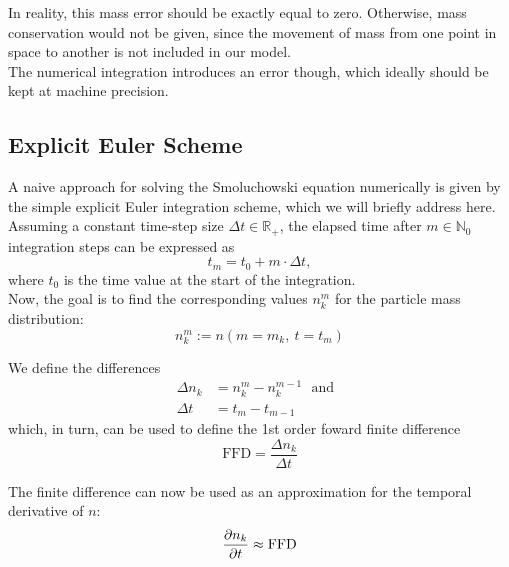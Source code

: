         In reality, this mass error should be exactly equal to zero. Otherwise, mass conservation would not be given, since the movement of mass from one point in space to another is not included in our model. \\
        
        The numerical integration introduces an error though, which ideally should be kept at machine precision. %

    \subsection{Explicit Euler Scheme}

        A naive approach for solving the Smoluchowski equation numerically is given by the simple 
        explicit Euler integration scheme, which we will briefly address here. Assuming a constant 
        time-step size $\Delta t\in\mathbb R_+$, the elapsed time after $m\in\mathbb N_0$ integration 
        steps can be expressed as 
        \begin{equation}
            t_m
                =t_0+m\cdot\Delta t,
        \end{equation}
        where $t_0$ is the time value at the start of the integration.\\
        
        Now, the goal is to find the corresponding values $n_k^m$ for the particle mass 
        distribution:
        \begin{equation}
            n_k^m
                :=n(m=m_k,\ t=t_m)
        \end{equation}
        
        We define the differences
        \begin{align}
            \Delta n_k
                &=n_k^m-n_k^{m-1}
            \ \ \ \text{and}\ \ \
            \\
            \Delta t
                &=t_m-t_{m-1}
        \end{align}
        which, in turn, can be used to define the 1st order foward finite difference
        \begin{equation}
            \text{FFD}
                =\frac{\Delta n_k}{\Delta t}
        \end{equation}
        
        The finite difference can now be used as an approximation for the temporal derivative 
        of $n$:
        \begin{equation}
            \frac{\partial n_k}{\partial t}
                \approx\text{FFD}
        \end{equation}
        
